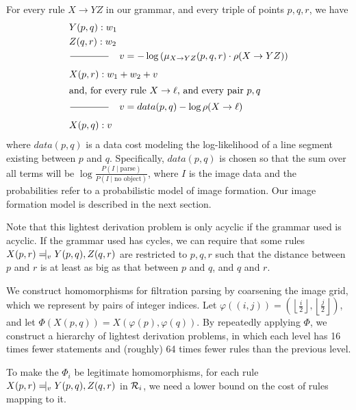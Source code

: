 For every rule $X\to YZ$ in our grammar, and every triple of points
$p,q,r$, we have
\begin{align*}
&Y(p,q) : w_1\\
&Z(q,r) : w_2\\
&\frac{\qquad \qquad}{\qquad\qquad}\quad v=-\log \left(\mu_{X\to YZ}(p,q,r) \cdot \rho(X \to YZ)\right)\\
&X(p,r) : w_1 + w_2 + v \\
\intertext{and, for every rule $X \to \ell$, and every pair $p,q$}
&\frac{\qquad \qquad}{\qquad\qquad}\quad v = data(p,q) -\log \rho(X\to \ell)\\
&X(p,q) : v
\end{align*}
where $data(p,q)$ is a data cost modeling the log-likelihood of a line
segment existing between $p$ and $q$. Specifically, $data(p,q)$ is
chosen so that the sum over all terms will be $\log \frac{P(I\mid
  \mbox{parse})}{P(I\mid \mbox{no object})}$, where $I$ is the image
data and the probabilities refer to a probabilistic model of image
formation. Our image formation model is described in the next section.

Note that this lightest derivation problem is only acyclic if the
grammar used is acyclic. If the grammar used has cycles, we can
require that some rules $X(p,r)\tne_v Y(p,q), Z(q,r)$ are restricted
to $p,q,r$ such that the distance between $p$ and $r$ is at least as
big as that between $p$ and $q$, and $q$ and $r$.

We construct homomorphisms for filtration parsing by coarsening the
image grid, which we represent by pairs of integer indices.  Let
$\varphi((i,j)) = \left(\left\lfloor \frac{i}{2} \right\rfloor,
  \left\lfloor \frac{j}{2} \right\rfloor \right)$, and let
$\Phi(X(p,q)) = X(\varphi(p),\varphi(q))$. By repeatedly applying
$\Phi$, we construct a hierarchy of lightest derivation problems, in
which each level has 16 times fewer statements and (roughly) 64 times
fewer rules than the previous level.

To make the $\Phi_i$ be legitimate homomorphisms, for each rule
$X(p,r) \tne_v Y(p,q), Z(q,r)$ in ${\mathcal R}_i$, we need a lower bound on
the cost of rules mapping to it.



